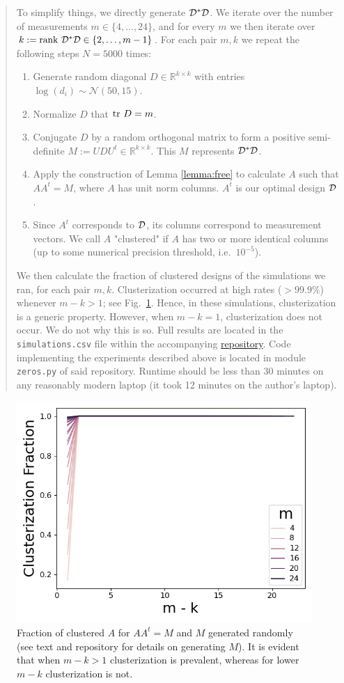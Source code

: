 \begin{quote}
To simplify things, we directly generate $\mathcal{D}^*\mathcal{D}$. We iterate over
the number of measurements $m \in \{4,\dots, 24\}$, and for every $m$
we then iterate over $k:=\textup{rank}\  \mathcal{D}^*\mathcal{D} \in \{2,\dots, m-1\}$. For
each pair $m,k$ we repeat the following steps $N=5000$ times:
\begin{enumerate}
\item Generate random diagonal $D\in \mathbb{R}^{k\times k}$ with
  entries $\log (d_i) \sim \mathcal{N}(50,15)$.
\item Normalize $D$ that $\textup{tr}\ D = m$.
\item Conjugate $D$ by a random orthogonal matrix to form a positive
  semi-definite $M := UDU^t \in \mathbb{R}^{k\times k}$. This $M$
  represents $\mathcal{D}^*\mathcal{D}$.
\item Apply the construction of Lemma \ref{lemma:free} to calculate
  $A$ such that $AA^t = M$, where $A$ has unit norm columns. $A^t$ is
  our optimal design $\mathcal{D}$.
\item Since $A^t$ corresponds to $\mathcal{D}$, its columns correspond to
  measurement vectors. We call $A$ "clustered" if $A$ has two or more
  identical columns (up to some numerical precision threshold,
  i.e.~$10^{-5}$).
\end{enumerate}
We then calculate the fraction of clustered designs of the simulations
we ran, for each pair $m,k$. Clusterization occurred at high rates
($>99.9\%$) whenever $m-k > 1$; see Fig.~\ref{fig:sim_AAt}. Hence, in
these simulations, clusterization is a generic property. However, when
$m-k = 1$, clusterization does not occur. We do not why this is so.
\newline
\newline
Full results are located in the \texttt{simulations.csv} file within
the accompanying \href{https://github.com/yairdaon/OED}{repository}.
Code implementing the experiments described above is located in module
\texttt{zeros.py} of said repository. Runtime should be less than 30
minutes on any reasonably modern laptop (it took 12 minutes on the
author's laptop).
\end{quote}

\begin{figure}
    \centering
    \includegraphics[height=0.5\textwidth]{../latex/figs/simulations.png}
    \caption{Fraction of clustered $A$ for $AA^t = M$ and $M$
      generated randomly (see text and repository for details on
      generating $M$). It is evident that when $m-k > 1$ clusterization
      is prevalent, whereas for lower $m-k$ clusterization is not.}
  \label{fig:sim_AAt}
\end{figure}

